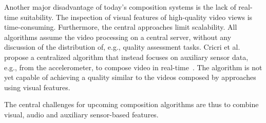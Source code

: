 Another major disadvantage of today's composition systems is the lack of real-time suitability. 
The inspection of visual features of high-quality video views is time-consuming.
Furthermore, the central approaches limit scalability.
All algorithms assume the video processing on a central server, without any discussion of the distribution of, e.g., quality assessment tasks.
Cricri et al. propose a centralized algorithm that instead focuses on auxiliary sensor data, e.g., from the accelerometer, to compose video in real-time~\cite{Cricri2012}.
The algorithm is not yet capable of achieving a quality similar to the videos composed by approaches using visual features.

The central challenges for upcoming composition algorithms are thus to combine visual, audio and auxiliary sensor-based features.
